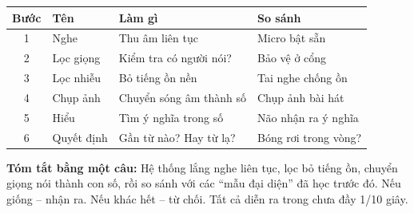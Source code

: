\documentclass[12pt,a4paper]{article}
\begin{document}
\begin{center}
\begin{tabular}{clll}
\toprule
\textbf{Bước} & \textbf{Tên} & \textbf{Làm gì} & \textbf{So sánh} \\
\midrule
1 & Nghe & Thu âm liên tục & Micro bật sẵn \\
2 & Lọc giọng & Kiểm tra có người nói? & Bảo vệ ở cổng \\
3 & Lọc nhiễu & Bỏ tiếng ồn nền & Tai nghe chống ồn \\
4 & Chụp ảnh & Chuyển sóng âm thành số & Chụp ảnh bài hát \\
5 & Hiểu & Tìm ý nghĩa trong số & Não nhận ra ý nghĩa \\
6 & Quyết định & Gần từ nào? Hay từ lạ? & Bóng rơi trong vòng? \\
\bottomrule
\end{tabular}
\end{center}

\vspace{1cm}

\begin{examplebox}
\textbf{Tóm tắt bằng một câu:}
Hệ thống lắng nghe liên tục, lọc bỏ tiếng ồn, chuyển giọng nói thành con số,
rồi so sánh với các ``mẫu đại diện'' đã học trước đó. Nếu giống -- nhận ra.
Nếu khác hết -- từ chối. Tất cả diễn ra trong chưa đầy 1/10 giây.
\end{examplebox}
\end{document}
